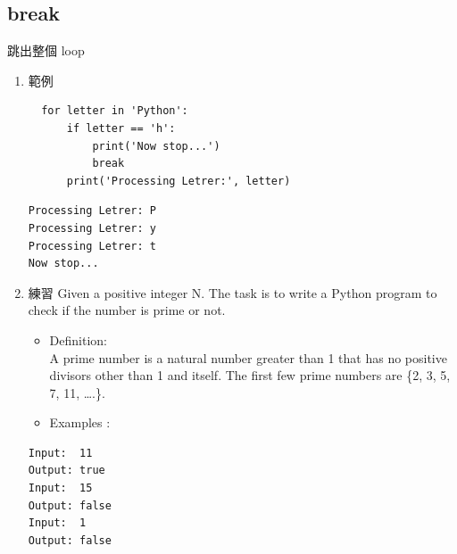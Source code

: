 \documentclass[a4paper,12pt]{article}
\begin{document}
\subsection{break}
\label{sec:org4853911}
跳出整個 loop\\
\begin{enumerate}
\item 範例
\label{sec:orgbfeb805}
\lstset{breaklines=true,language=Python,label= ,caption= ,captionpos=b,firstnumber=1,numbers=left}
\begin{lstlisting}
  for letter in 'Python':
      if letter == 'h':
          print('Now stop...')
          break
      print('Processing Letrer:', letter)
\end{lstlisting}

\begin{verbatim}
Processing Letrer: P
Processing Letrer: y
Processing Letrer: t
Now stop...
\end{verbatim}
\item 練習
\label{sec:org4e95b78}
Given a positive integer N. The task is to write a Python program to check if the number is prime or not.\\
\begin{itemize}
\item Definition:\\
A prime number is a natural number greater than 1 that has no positive divisors other than 1 and itself. The first few prime numbers are \{2, 3, 5, 7, 11, ….\}.\\
\item Examples :\\
\end{itemize}
\begin{verbatim}
Input:  11
Output: true
Input:  15
Output: false
Input:  1
Output: false
\end{verbatim}
\end{enumerate}
\end{document}
